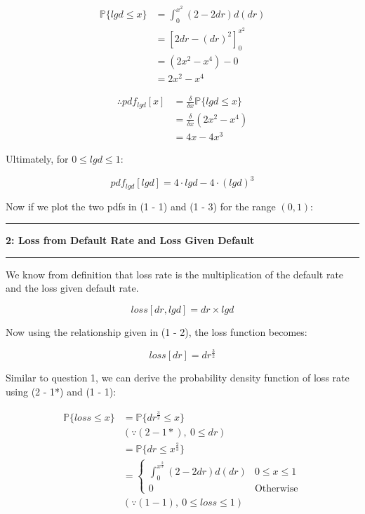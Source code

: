 \documentclass[11pt]{article}
\newcommand\question[2]{\vspace{.25in}\hrule\textbf{#1: #2}\vspace{.5em}\hrule\vspace{.10in}}
\renewcommand{\P}{\mathbb{P}}
\begin{document}
$$
\begin{aligned}
\P\{lgd \leq x\} &=
\int_0^{x^2} (2 - 2dr) d(dr) \\
&= \left[ 
2dr - (dr)^2
\right]_0^{x^2} \\
&= (2x^2 - x^4) - 0 \\
&= 2x^2 - x^4
\end{aligned}
$$

$$
\begin{aligned}
\therefore
pdf_{lgd}[x] &= 
\frac{\delta}{\delta x} \P\{lgd \leq x\} \\
&= \frac{\delta}{\delta x} (2x^2 - x^4) \\
&= 4x - 4x^3 
\end{aligned}
$$

Ultimately, for $0 \leq lgd \leq 1$:

\begin{equation} \tag{1 - 3}
pdf_{lgd}[lgd] =
4 \cdot lgd - 4 \cdot (lgd)^3
\end{equation}

Now if we plot the two pdfs in (1 - 1) and (1 - 3) for the
range $(0, 1)$:

\newpage

\question{2}{Loss from Default Rate and Loss Given Default}

We know from definition that loss rate is the multiplication of
the default rate and the loss given default rate.

\begin{equation} \tag{2 - 1}
loss[dr, lgd] = dr \times lgd
\end{equation}

Now using the relationship given in (1 - 2), the loss function
becomes:

\begin{equation} \tag{2 - 1*}
loss[dr] = dr^{\frac{3}{2}}
\end{equation}

Similar to question 1, we can derive the probability density function
of loss rate using (2 - 1*) and (1 - 1):

$$
\begin{aligned}
\P\{loss \leq x\} &=
\P\{dr^{\frac{3}{2}} \leq x\} \\
&(\because (2 - 1*), \ 0 \leq dr) \\
&= \P\{dr \leq x^{\frac{2}{3}}\} \\
&= \begin{cases} 
\int_0^{x^{\frac{2}{3}}} (2 - 2dr) d(dr) & 0 \leq x \leq 1 \\
0 & \text{Otherwise}
\end{cases}
\\
&(\because (1 - 1), \ 0 \leq loss \leq 1)
\end{aligned}
$$
\end{document}
